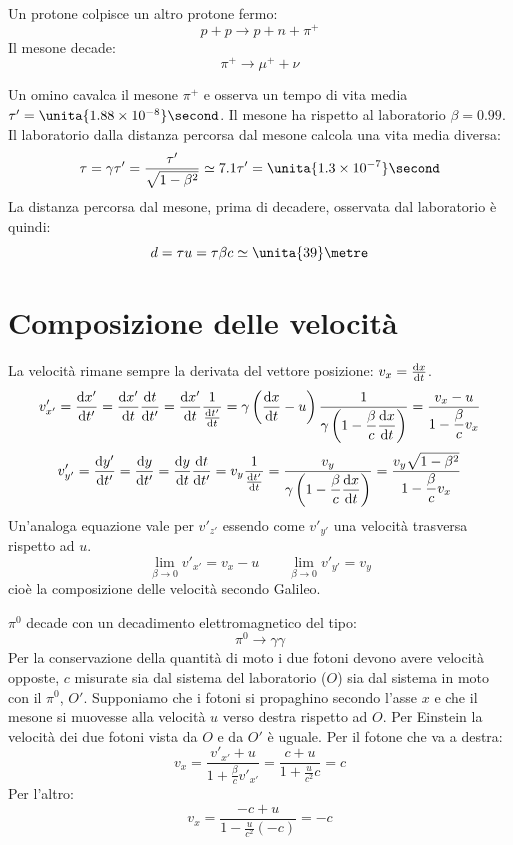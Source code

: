 \begin{Es}
Un protone colpisce un altro protone fermo:
$$p+p\rightarrow p+n+\pi^+$$
Il mesone decade:
$$\pi^+ \rightarrow \mu ^+ + \nu$$

Un omino cavalca il mesone $\pi^+$ e osserva un tempo di vita media $\tau'=\unita{1.88\times 10^{-8}}\second$. Il mesone ha rispetto al laboratorio $\beta=0.99$. Il laboratorio dalla distanza percorsa dal mesone calcola una vita media diversa:
$$\tau=\gamma\tau'=\frac{\tau'}{\sqrt{1-\beta^2}}\simeq 7.1\tau'=\unita{1.3\times 10^{-7}}\second$$
La distanza percorsa dal mesone, prima di decadere, osservata dal laboratorio è quindi:
$$d=\tau u=\tau \beta c\simeq \unita{39}\metre$$
\end{Es}

\section{Composizione delle velocità}
La velocità rimane sempre la derivata del vettore posizione: $v_x=\frac{\mathrm{d} x}{\mathrm{d} t}$.
\begin{equation}
v'_{x'}=\frac{\mathrm{d} x'}{\mathrm{d} t'}=\frac{\mathrm{d} x'}{\mathrm{d} t}\frac{\mathrm{d} t}{\mathrm{d} t'}=\frac{\mathrm{d} x'}{\mathrm{d} t}\dfrac{1}{\frac{\mathrm{d} t'}{\mathrm{d} t}}=\gamma\left(\frac{\mathrm{d} x}{\mathrm{d} t}-u\right)\dfrac{1}{\gamma\left(1-\dfrac{\beta}{c}\dfrac{\mathrm{d} x}{\mathrm{d} t}\right)}=\dfrac{v_x-u}{1-\dfrac{\beta}{c}v_x}
\end{equation}
\begin{equation}
v'_{y'}=\frac{\mathrm{d} y'}{\mathrm{d} t'}=\frac{\mathrm{d} y}{\mathrm{d} t'}=\frac{\mathrm{d} y}{\mathrm{d} t}\frac{\mathrm{d} t}{\mathrm{d} t'}=v_y\frac{1}{\frac{\mathrm{d} t'}{\mathrm{d} t}}=\dfrac{v_y}{\gamma\left(1-\dfrac{\beta}{c}\dfrac{\mathrm{d} x}{\mathrm{d} t}\right)}=\dfrac{v_y\sqrt{1-\beta^2}}{1-\dfrac{\beta}{c}v_x}
\end{equation}
Un'analoga equazione vale per $v'_{z'}$ essendo come $v'_{y'}$ una velocità trasversa rispetto ad $u$.
$$\lim_{\beta\rightarrow 0}v'_{x'}=v_x-u\qquad \lim_{\beta\rightarrow 0} v'_{y'}=v_y$$
cioè la composizione delle velocità secondo Galileo.

\begin{Es}[decadimento $\pi^0$]
$\pi^0$ decade con un decadimento elettromagnetico del tipo:
$$\pi^0\rightarrow \gamma\gamma$$
Per la conservazione della quantità di moto i due fotoni devono avere velocità opposte, $c$ misurate sia dal sistema del laboratorio ($O$) sia dal sistema in moto con il $\pi^0$, $O'$. Supponiamo che i fotoni si propaghino secondo l'asse $x$ e che il mesone si muovesse alla velocità $u$ verso destra rispetto ad $O$. Per Einstein la velocità dei due fotoni vista da $O$ e da $O'$ è uguale.
Per il fotone che va a destra:
$$v_x=\frac{v'_{x'}+u}{1+\frac{\beta}{c}v'_{x'}}=\frac{c+u}{1+\frac{u}{c^2}c}=c$$
Per l'altro:
$$v_x=\frac{-c+u}{1-\frac{u}{c^2}(-c)}=-c$$
\end{Es}
